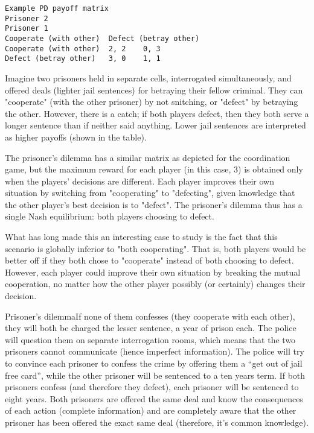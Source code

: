 \documentclass[]{report}
\begin{document}
\begin{verbatim}
Example PD payoff matrix
Prisoner 2
Prisoner 1
Cooperate (with other)	Defect (betray other)
Cooperate (with other)	2, 2	0, 3
Defect (betray other)	3, 0	1, 1
\end{verbatim}

Imagine two prisoners held in separate cells, interrogated simultaneously, and offered deals (lighter jail sentences) for betraying their fellow criminal. They can "cooperate" (with the other prisoner) by not snitching, or "defect" by betraying the other. However, there is a catch; if both players defect, then they both serve a longer sentence than if neither said anything. Lower jail sentences are interpreted as higher payoffs (shown in the table).

The prisoner's dilemma has a similar matrix as depicted for the coordination game, but the maximum reward for each player (in this case, 3) is obtained only when the players' decisions are different. Each player improves their own situation by switching from "cooperating" to "defecting", given knowledge that the other player's best decision is to "defect". The prisoner's dilemma thus has a single Nash equilibrium: both players choosing to defect.

What has long made this an interesting case to study is the fact that this scenario is globally inferior to "both cooperating". That is, both players would be better off if they both chose to "cooperate" instead of both choosing to defect. However, each player could improve their own situation by breaking the mutual cooperation, no matter how the other player possibly (or certainly) changes their decision.




Prisoner's dilemmaIf none of them confesses (they cooperate with each other), they will both be charged the lesser sentence, a year of prison each. The police will question them on separate interrogation rooms, which means that the two prisoners cannot communicate (hence imperfect information). The police will try to convince each prisoner to confess the crime by offering them a “get out of jail free card”, while the other prisoner will be sentenced to a ten years term. If both prisoners confess (and therefore they defect), each prisoner will be sentenced to eight years. Both prisoners are offered the same deal and know the consequences of each action (complete information) and are completely aware that the other prisoner has been offered the exact same deal (therefore, it’s common knowledge).
\end{document}
